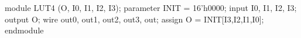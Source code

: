 \begin{vcode}
module LUT4 (O, I0, I1, I2, I3);
    parameter INIT = 16'h0000;
    input I0, I1, I2, I3;
    output O;
    wire out0, out1, out2, out3, out;
    assign O = INIT[{I3,I2,I1,I0}];
endmodule
\end{vcode}

